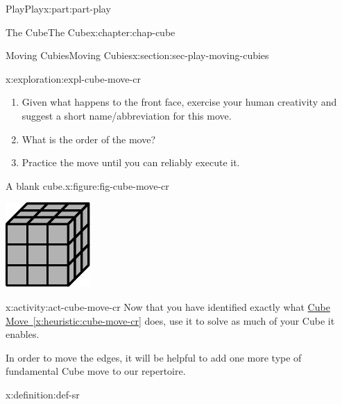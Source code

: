 \documentclass[oneside,10pt,]{book}
\newcommand{\xreffont}{\relax}
\numberwithin{equation}{section}
\begin{document}
\begin{partptx}{Play}{}{Play}{}{}{x:part:part-play}
\begin{chapterptx}{The Cube}{}{The Cube}{}{}{x:chapter:chap-cube}
\begin{sectionptx}{Moving Cubies}{}{Moving Cubies}{}{}{x:section:sec-play-moving-cubies}
\begin{exploration}{}{x:exploration:expl-cube-move-cr}
\begin{enumerate}
\item{}Given what happens to the front face, exercise your human creativity and suggest a short name\slash{}abbreviation for this move.%
\item{}What is the order of the move?%
\item{}Practice the move until you can reliably execute it.%
\end{enumerate}
\begin{figureptx}{A blank cube.}{x:figure:fig-cube-move-cr}{}%
\begin{image}{0.25}{0.5}{0.25}%
\includegraphics[width=\linewidth]{./images/grey_cube.pdf}
\end{image}%
\tcblower
\end{figureptx}%
\end{exploration}%
\begin{activity}{}{x:activity:act-cube-move-cr}%
Now that you have identified exactly what \hyperref[x:heuristic:cube-move-cr]{Cube Move~{\xreffont\ref{x:heuristic:cube-move-cr}}} does, use it to solve as much of your Cube it enables.%
\end{activity}%
In order to move the edges, it will be helpful to add one more type of fundamental Cube move to our repertoire.%
\begin{definition}{}{x:definition:def-sr}%
%

\end{definition}
\end{sectionptx}
\end{chapterptx}
\end{partptx}
\end{document}
